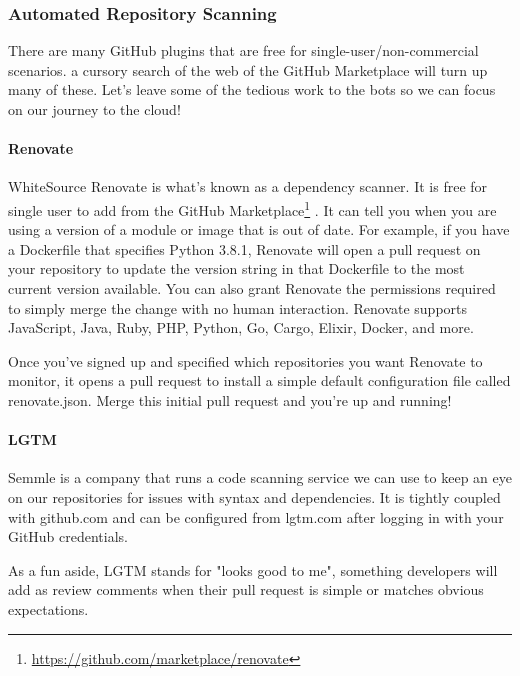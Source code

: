 \hypertarget{automated-repository-scanning}{%
\subsubsection{Automated Repository
Scanning}\label{automated-repository-scanning}}

There are many GitHub plugins that are free for
single-user/non-commercial scenarios. a cursory search of the web of the
GitHub Marketplace will turn up many of these. Let's leave some of the
tedious work to the bots so we can focus on our journey to the cloud!

\hypertarget{renovate}{%
\paragraph{Renovate}\label{renovate}}

WhiteSource Renovate is what's known as a dependency scanner. It is free
for single user to add from the GitHub Marketplace\footnote{\url{https://github.com/marketplace/renovate}}
. It can tell you when you are using a version of a module or image that
is out of date. For example, if you have a Dockerfile that specifies
Python 3.8.1, Renovate will open a pull request on your repository to
update the version string in that Dockerfile to the most current version
available. You can also grant Renovate the permissions required to
simply merge the change with no human interaction. Renovate supports
JavaScript, Java, Ruby, PHP, Python, Go, Cargo, Elixir, Docker, and
more.

Once you've signed up and specified which repositories you want Renovate
to monitor, it opens a pull request to install a simple default
configuration file called renovate.json. Merge this initial pull request
and you're up and running!

\hypertarget{lgtm}{%
\paragraph{LGTM}\label{lgtm}}

Semmle is a company that runs a code scanning service we can use to keep
an eye on our repositories for issues with syntax and dependencies. It
is tightly coupled with github.com and can be configured from lgtm.com
after logging in with your GitHub credentials.

As a fun aside, LGTM stands for "looks good to me", something developers
will add as review comments when their pull request is simple or matches
obvious expectations.

